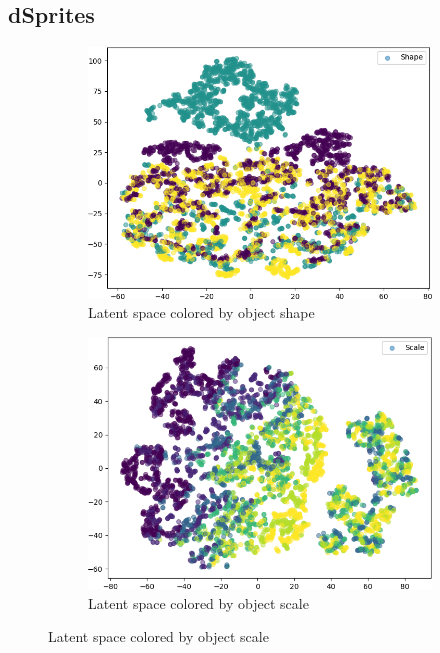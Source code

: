 \subsection{dSprites}
\begin{figure}[H]
    \centering
    \begin{subfigure}{.19\textwidth}
        \includegraphics[width=\textwidth]{images/latent_spaces/dsprites/vae_gan/embeddings_mu_0.png}
        \caption{Latent space colored by object shape}
    \end{subfigure}
    \hfill
    \begin{subfigure}{.19\textwidth}
        \includegraphics[width=\textwidth]{images/latent_spaces/dsprites/vae_gan/embeddings_mu_1.png}
        \caption{Latent space colored by object scale}

\end{subfigure}
\end{figure}
